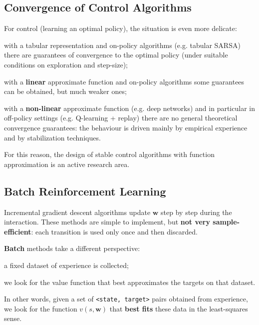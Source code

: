 \subsection{Convergence of Control Algorithms}

For control (learning an optimal policy), the situation is even more delicate:

\begin{compactitemize}
    \item with a tabular representation and on-policy algorithms (e.g. tabular SARSA) there are guarantees of convergence to the optimal policy (under suitable conditions on exploration and step-size);
    \item with a \textbf{linear} approximate function and on-policy algorithms some guarantees can be obtained, but much weaker ones;
    \item with a \textbf{non-linear} approximate function (e.g. deep networks) and in particular in off-policy settings (e.g. Q-learning + replay) there are no general theoretical convergence guarantees: the behaviour is driven mainly by empirical experience and by stabilization techniques.
\end{compactitemize}

For this reason, the design of stable control algorithms with function approximation is an active research area.

\subsection{Batch Reinforcement Learning}

Incremental gradient descent algorithms update $\mathbf{w}$ step by step during the interaction.
These methods are simple to implement, but \textbf{not very sample-efficient}: each transition is used only once and then discarded.

\textbf{Batch} methods take a different perspective:

\begin{compactitemize}
    \item a fixed dataset of experience is collected;
    \item we look for the value function that best approximates the targets on that dataset.
\end{compactitemize}

In other words, given a set of \texttt{<state, target>} pairs obtained from experience, we look for the function $v(s,\mathbf{w})$ that \textbf{best fits} these data in the least-squares sense.

